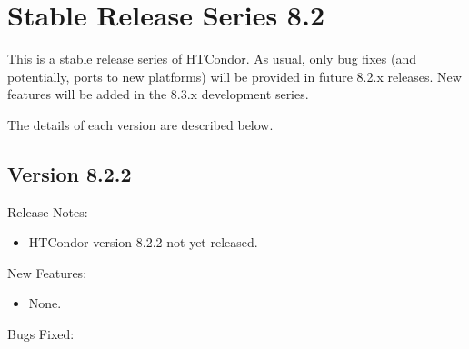 
\section{\label{sec:History-8-2}Stable Release Series 8.2}

This is a stable release series of HTCondor.
As usual, only bug fixes (and potentially, ports to new platforms)
will be provided in future 8.2.x releases.
New features will be added in the 8.3.x development series.

The details of each version are described below.

\subsection*{\label{sec:New-8-2-2}Version 8.2.2}

\noindent Release Notes:

\begin{itemize}

\item HTCondor version 8.2.2 not yet released.

\end{itemize}

\noindent New Features:

\begin{itemize}

\item None.

\end{itemize}

\noindent Bugs Fixed:

